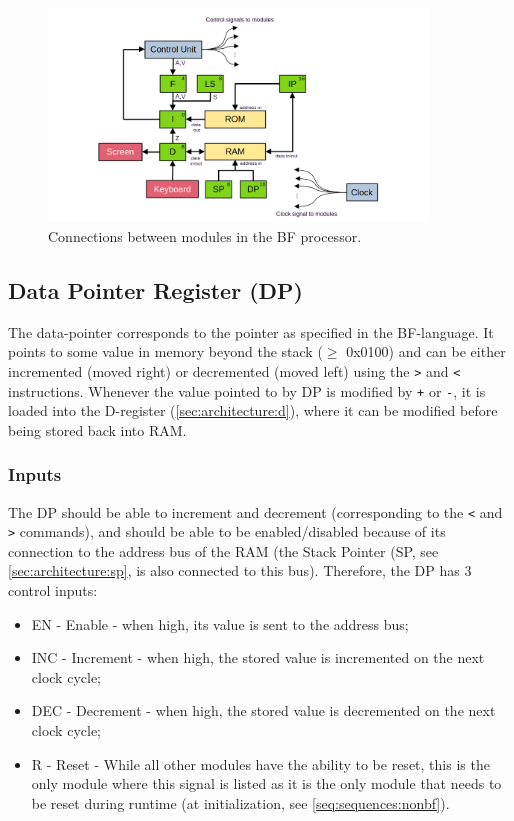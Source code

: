 \begin{figure}[H]
  \centering
  \includegraphics[width=0.9\textwidth]{img/bfcpu_architecture}
  \caption{Connections between modules in the BF processor.}
  \label{fig:architecture}
\end{figure}


\subsection{Data Pointer Register (DP)} \label{sec:architecture:dp}
The data-pointer corresponds to the pointer as specified in the BF-language. It points to some value in memory beyond the stack ($\ge$ 0x0100) and can be either incremented (moved right) or decremented (moved left) using the \texttt{>} and \texttt{<} instructions. Whenever the value pointed to by DP is modified by \texttt{+} or \texttt{-}, it is loaded into the D-register (\ref{sec:architecture:d}), where it can be modified before being stored back into RAM.

\subsubsection*{Inputs}
The DP should be able to increment and decrement (corresponding to the \texttt{<} and \texttt{>} commands), and should be able to be enabled/disabled because of its connection to the address bus of the RAM (the Stack Pointer (SP, see \ref{sec:architecture:sp}, is also connected to this bus). Therefore, the DP has 3 control inputs:
\begin{itemize}
\itemsep0em 
\item EN - Enable - when high, its value is sent to the address bus;
\item INC - Increment - when high, the stored value is incremented on the next clock cycle;
\item DEC - Decrement - when high, the stored value is decremented on the next clock cycle;
\item R - Reset - While all other modules have the ability to be reset, this is the only module where this signal is listed as it is the only module that needs to be reset during runtime (at initialization, see \ref{seq:sequences:nonbf}).
\end{itemize}

